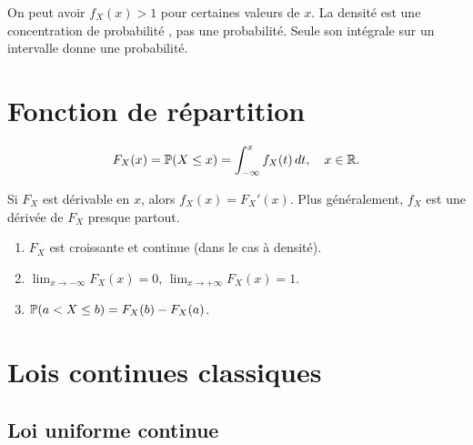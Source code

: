 \begin{attention}[title=\textbf{La densit\'e n'est pas une probabilit\'e}]
On peut avoir $f_X(x) > 1$ pour certaines valeurs de $x$. La densit\'e est une
\og concentration de probabilit\'e \fg, pas une probabilit\'e. Seule son
int\'egrale sur un intervalle donne une probabilit\'e.
\end{attention}

\section{Fonction de r\'epartition}

\begin{definition}
\[
    F_X(x) = \mathbb{P}(X \leq x) = \int_{-\infty}^{x} f_X(t)\, dt, \quad x \in \mathbb{R}.
\]
\end{definition}

\begin{theoreme}
Si $F_X$ est d\'erivable en $x$, alors $f_X(x) = F_X'(x)$. Plus g\'en\'eralement,
$f_X$ est une d\'eriv\'ee de $F_X$ presque partout.
\end{theoreme}

\begin{proposition}[Propri\'et\'es de $F_X$]
\begin{enumerate}[label=(\roman*)]
    \item $F_X$ est croissante et continue (dans le cas \`a densit\'e).
    \item $\lim_{x \to -\infty} F_X(x) = 0$, $\lim_{x \to +\infty} F_X(x) = 1$.
    \item $\mathbb{P}(a < X \leq b) = F_X(b) - F_X(a)$.
\end{enumerate}
\end{proposition}

\section{Lois continues classiques}

\subsection{Loi uniforme continue}

